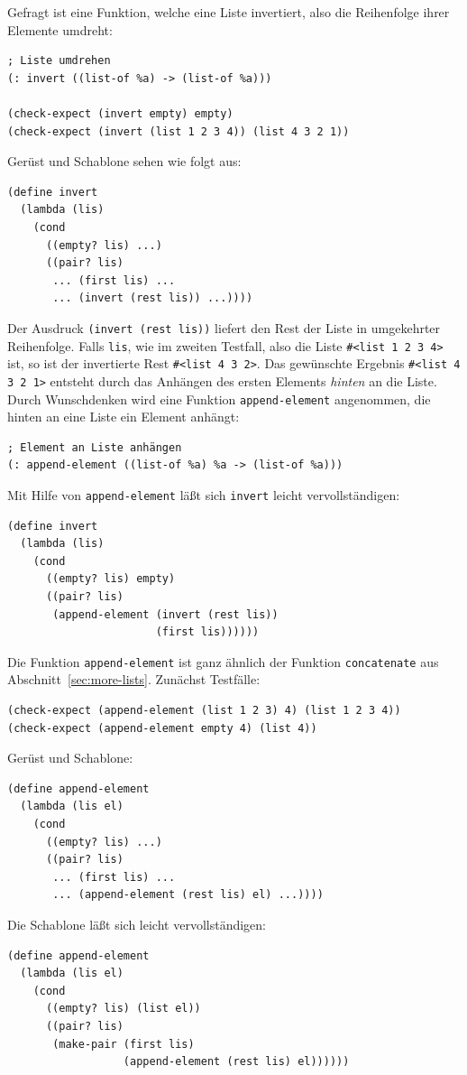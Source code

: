 Gefragt ist eine Funktion, welche eine Liste invertiert, also die
Reihenfolge ihrer Elemente umdreht:\label{sec:invert}
%
\begin{verbatim}
; Liste umdrehen
(: invert ((list-of %a) -> (list-of %a)))

(check-expect (invert empty) empty)
(check-expect (invert (list 1 2 3 4)) (list 4 3 2 1))
\end{verbatim}
%
Gerüst und Schablone sehen wie folgt aus:
%
\begin{verbatim}
(define invert
  (lambda (lis)
    (cond
      ((empty? lis) ...)
      ((pair? lis)
       ... (first lis) ...
       ... (invert (rest lis)) ...))))
\end{verbatim}
%
Der Ausdruck \texttt{(invert (rest lis))} liefert den Rest der Liste
in umgekehrter Reihenfolge.  Falls \texttt{lis}, wie im zweiten
Testfall, also die Liste \verb|#<list 1 2 3 4>| ist, so ist der
invertierte Rest \verb|#<list 4 3 2>|.  Das gewünschte Ergebnis
\verb|#<list 4 3 2 1>| entsteht durch das Anhängen des ersten Elements
\emph{hinten} an die Liste.  Durch Wunschdenken wird eine Funktion
\texttt{append-element}
angenommen, die hinten an eine Liste ein Element anhängt:
%
\begin{verbatim}
; Element an Liste anhängen
(: append-element ((list-of %a) %a -> (list-of %a)))
\end{verbatim}
%
Mit Hilfe von \texttt{append-element} läßt sich \texttt{invert} leicht
vervollständigen:
%
\begin{verbatim}
(define invert
  (lambda (lis)
    (cond
      ((empty? lis) empty)
      ((pair? lis)
       (append-element (invert (rest lis))
                       (first lis))))))
\end{verbatim}
%
Die Funktion \texttt{append-element} ist ganz ähnlich der Funktion
\texttt{concatenate} aus Abschnitt~\ref{sec:more-lists}.  Zunächst
Testfälle:
%
\begin{verbatim}
(check-expect (append-element (list 1 2 3) 4) (list 1 2 3 4))
(check-expect (append-element empty 4) (list 4))
\end{verbatim}
%
Gerüst und Schablone:
%
\begin{verbatim}
(define append-element
  (lambda (lis el)
    (cond
      ((empty? lis) ...)
      ((pair? lis)
       ... (first lis) ...
       ... (append-element (rest lis) el) ...))))
\end{verbatim}
%
Die Schablone läßt sich leicht vervollständigen:
%
\begin{verbatim}
(define append-element
  (lambda (lis el)
    (cond
      ((empty? lis) (list el))
      ((pair? lis)
       (make-pair (first lis)
                  (append-element (rest lis) el))))))
\end{verbatim}
